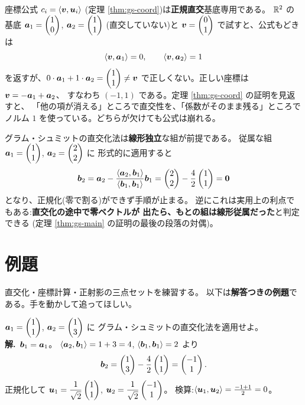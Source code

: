 \begin{hanrei}[直交していない基底で座標公式を使ってはいけない]\label{hanrei:gs-nonorth}
座標公式 $c_i = \langle \bm{v}, \bm{u}_i \rangle$
(定理 \ref{thm:gs-coord})は\textbf{正規直交}基底専用である。
$\mathbb{R}^2$ の基底 $\bm{a}_1 = \begin{pmatrix}1 \\ 0\end{pmatrix}$, $\bm{a}_2 = \begin{pmatrix}1 \\ 1\end{pmatrix}$
(直交していない)と $\bm{v} = \begin{pmatrix}0 \\ 1\end{pmatrix}$ で試すと、公式もどきは
\[
\langle \bm{v}, \bm{a}_1 \rangle = 0, \qquad
\langle \bm{v}, \bm{a}_2 \rangle = 1
\]
を返すが、$0 \cdot \bm{a}_1 + 1 \cdot \bm{a}_2 = \begin{pmatrix}1 \\ 1\end{pmatrix} \neq \bm{v}$
で正しくない。正しい座標は $\bm{v} = -\bm{a}_1 + \bm{a}_2$、
すなわち $(-1, 1)$ である。定理 \ref{thm:gs-coord} の証明を見返すと、
「他の項が消える」ところで直交性を、「係数がそのまま残る」ところで
ノルム $1$ を使っている。どちらが欠けても公式は崩れる。
\end{hanrei}

\begin{hanrei}[線形従属な組に直交化法を使うと零ベクトルが現れる]\label{hanrei:gs-dependent}
グラム・シュミットの直交化法は\textbf{線形独立}な組が前提である。
従属な組 $\bm{a}_1 = \begin{pmatrix}1 \\ 1\end{pmatrix}$, $\bm{a}_2 = \begin{pmatrix}2 \\ 2\end{pmatrix}$ に
形式的に適用すると
\[
\bm{b}_2 = \bm{a}_2 -
\frac{\langle \bm{a}_2, \bm{b}_1 \rangle}{\langle \bm{b}_1, \bm{b}_1 \rangle}
\bm{b}_1 = \begin{pmatrix}2 \\ 2\end{pmatrix} - \frac{4}{2}\begin{pmatrix}1 \\ 1\end{pmatrix} = \bm{0}
\]
となり、正規化(零で割る)ができず手順が止まる。
逆にこれは実用上の利点でもある:\textbf{直交化の途中で零ベクトルが
出たら、もとの組は線形従属だった}と判定できる
(定理 \ref{thm:gs-main} の証明の最後の段落の対偶)。
\end{hanrei}

\section{例題}

直交化・座標計算・正射影の三点セットを練習する。
以下は\textbf{解答つきの例題}である。手を動かして追ってほしい。

\begin{rei}[例題・基本(直交化)]\label{rei:gs-basic2d}
$\bm{a}_1 = \begin{pmatrix}1 \\ 1\end{pmatrix}$, $\bm{a}_2 = \begin{pmatrix}1 \\ 3\end{pmatrix}$ に
グラム・シュミットの直交化法を適用せよ。\\
\textbf{解.}\ $\bm{b}_1 = \bm{a}_1$。
$\langle \bm{a}_2, \bm{b}_1 \rangle = 1 + 3 = 4$,
$\langle \bm{b}_1, \bm{b}_1 \rangle = 2$ より
\[
\bm{b}_2 = \begin{pmatrix}1 \\ 3\end{pmatrix} - \frac{4}{2}\begin{pmatrix}1 \\ 1\end{pmatrix} = \begin{pmatrix}-1 \\ 1\end{pmatrix}.
\]
正規化して
$\bm{u}_1 = \dfrac{1}{\sqrt{2}}\begin{pmatrix}1 \\ 1\end{pmatrix}$,
$\bm{u}_2 = \dfrac{1}{\sqrt{2}}\begin{pmatrix}-1 \\ 1\end{pmatrix}$。
検算:$\langle \bm{u}_1, \bm{u}_2 \rangle = \frac{-1 + 1}{2} = 0$。
\end{rei}

